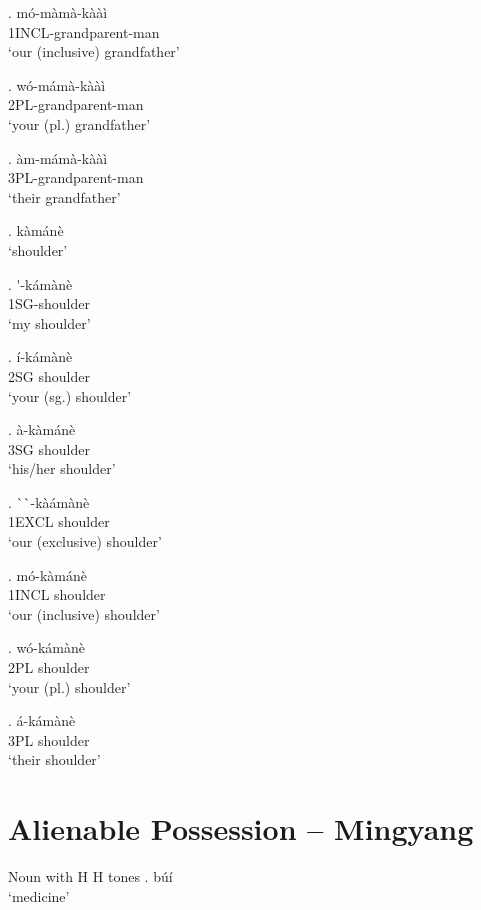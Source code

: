 \documentclass{assets/fieldnotes}
\newcommand{\mb}[1]{\textcolor{Dandelion}{#1}}
\begin{document}
\ex. m\'{o}-m\`{a}m\`{a}-k\`{a}\`{a}\`{i} \\
1INCL-grandparent-man \\
`our (inclusive) grandfather' 


\ex. w\'{o}-m\'{a}m\`{a}-k\`{a}\`{a}\`{i} \\
2PL-grandparent-man \\
`your (pl.) grandfather'

\ex. \`{a}m-m\'{a}m\`{a}-k\`{a}\`{a}\`{i} \\
3PL-grandparent-man \\
`their grandfather'



\ex. k\`{a}m\'{a}n\`{e} \\
`shoulder'

\ex. \'{}-k\'{a}m\`{a}n\`{e} \\
1SG-shoulder \\
`my shoulder'

\ex. \'{i}-k\'{a}m\`{a}n\`{e} \\
2SG shoulder \\
`your (sg.) shoulder'

\ex. \`{a}-k\`{a}m\'{a}n\`{e} \\
3SG shoulder \\
`his/her shoulder'

\ex. \`{}\`{}-k\`{a}\'{a}m\`{a}n\`{e} \\
1EXCL shoulder \\
`our (exclusive) shoulder'

\ex. m\'{o}-k\`{a}m\'{a}n\`{e} \\
1INCL shoulder \\
`our (inclusive) shoulder'

\ex. w\'{o}-k\'{a}m\`{a}n\`{e} \\
2PL shoulder \\
`your (pl.) shoulder'

\ex. \'{a}-k\'{a}m\`{a}n\`{e} \\
3PL shoulder \\
`their shoulder'




\section{Alienable Possession -- Mingyang}
\mb{Noun with H H tones}
\ex. búí\\
    `medicine'
\end{document}
